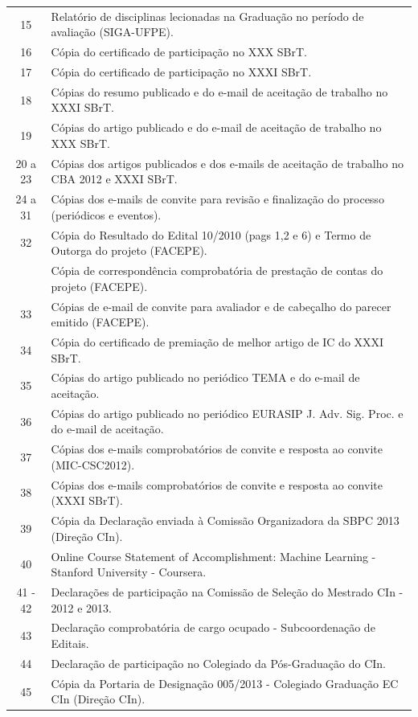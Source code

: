 \documentclass[a4paper,oneside,12pt]{article}
\begin{document}
\begin{table}[ht]
\begin{tabular}{cl}
  15 & Relatório de disciplinas lecionadas na Graduação no período de avaliação (SIGA-UFPE).\\
  16 & Cópia do certificado de participação no XXX SBrT. \\
  17 & Cópia do certificado de participação no XXXI SBrT. \\
  18 & Cópias do resumo publicado e do e-mail de aceitação de trabalho no XXXI SBrT. \\
  19 & Cópias do artigo publicado e do e-mail de aceitação de trabalho no XXX SBrT. \\
  20 a 23 & Cópias dos artigos publicados e dos e-mails de aceitação de trabalho no CBA 2012 e XXXI SBrT. \\
  24 a 31 & Cópias dos e-mails de convite para revisão e finalização do processo (periódicos e eventos). \\
  \cmidrule{1-2}
  32 & Cópia do Resultado do Edital 10/2010 (pags 1,2 e 6) e Termo de Outorga do projeto (FACEPE). \\
     & Cópia de correspondência comprobatória de prestação de contas do projeto (FACEPE). \\
  \cmidrule{1-2}
  33 & Cópias de e-mail de convite para avaliador e de cabeçalho do parecer emitido (FACEPE). \\
  34 & Cópia do certificado de premiação de melhor artigo de IC do XXXI SBrT. \\
  35 & Cópias do artigo publicado no periódico TEMA e do e-mail de aceitação. \\
  36 & Cópias do artigo publicado no periódico EURASIP J. Adv. Sig. Proc. e do e-mail de aceitação. \\
  37 & Cópias dos e-mails comprobatórios de convite e resposta ao convite (MIC-CSC2012). \\
  38 & Cópias dos e-mails comprobatórios de convite e resposta ao convite (XXXI SBrT). \\
  39 & Cópia da Declaração enviada à Comissão Organizadora da SBPC 2013 (Direção CIn). \\
  40 & Online Course Statement of Accomplishment: Machine Learning - Stanford University - Coursera. \\
  41 - 42 & Declarações de participação na Comissão de Seleção do Mestrado CIn - 2012 e 2013. \\
  43 & Declaração comprobatória de cargo ocupado - Subcoordenação de Editais. \\
  44 & Declaração de participação no Colegiado da Pós-Graduação do CIn. \\
  45 & Cópia da Portaria de Designação 005/2013 - Colegiado Graduação EC CIn (Direção CIn). \\
\bottomrule
\end{tabular}
\label{Tab:ListaAnexos}
\end{table}
\end{document}
